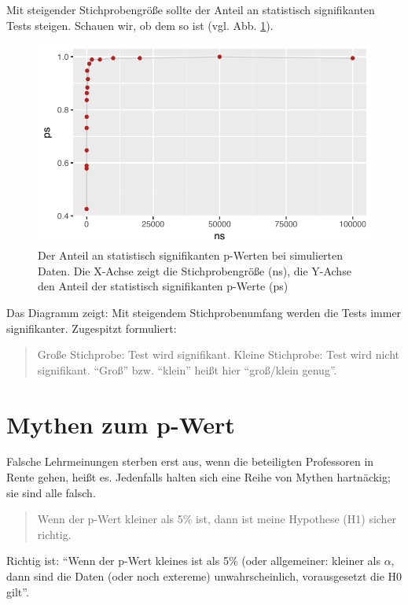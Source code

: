 \documentclass[12pt,ngerman,]{book}
\begin{document}
Mit steigender Stichprobengröße sollte der Anteil an statistisch
signifikanten Tests steigen. Schauen wir, ob dem so ist (vgl. Abb.
\ref{fig:simulate-pvalues}).

\begin{figure}

{\centering \includegraphics[width=0.7\linewidth]{images/simulate_ps} 

}

\caption{Der Anteil an statistisch signifikanten p-Werten bei simulierten Daten. Die X-Achse zeigt die Stichprobengröße (ns), die Y-Achse den Anteil der statistisch signifikanten p-Werte (ps)}\label{fig:simulate-pvalues}
\end{figure}

Das Diagramm zeigt: Mit steigendem Stichprobenumfang werden die Tests
immer signifikanter. Zugespitzt formuliert:

\begin{quote}
Große Stichprobe: Test wird signifikant. Kleine Stichprobe: Test wird
nicht signifikant. ``Groß'' bzw. ``klein'' heißt hier ``groß/klein
genug''.
\end{quote}

\section{Mythen zum p-Wert}\label{mythen-zum-p-wert}

Falsche Lehrmeinungen sterben erst aus, wenn die beteiligten Professoren
in Rente gehen, heißt es. Jedenfalls halten sich eine Reihe von Mythen
hartnäckig; sie sind alle falsch.

\begin{quote}
Wenn der p-Wert kleiner als 5\% ist, dann ist meine Hypothese (H1)
sicher richtig.
\end{quote}

Richtig ist: ``Wenn der p-Wert kleines ist als 5\% (oder allgemeiner:
kleiner als \(\alpha\), dann sind die Daten (oder noch extereme)
unwahrscheinlich, vorausgesetzt die H0 gilt''.
\end{document}
